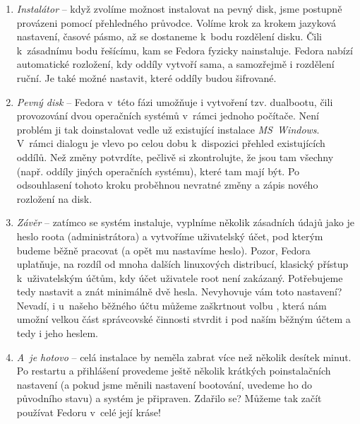 \begin{enumerate}
\item\emph{Instalátor} -- když zvolíme možnost instalovat na pevný disk, jsme postupně provázeni pomocí přehledného průvodce. Volíme krok za krokem jazyková nastavení, časové pásmo, až se dostaneme k~bodu rozdělení disku. Čili k~zásadnímu bodu řešícímu, kam se Fedora fyzicky nainstaluje. Fedora nabízí automatické rozložení, kdy oddíly vytvoří sama, a samozřejmě i rozdělení ruční. Je také možné nastavit, které oddíly budou šifrované. %

\item\emph{Pevný disk} -- Fedora v~této fázi umožňuje i vytvoření tzv. dualbootu, čili provozování dvou operačních systémů v~rámci jednoho počítače. Není problém ji tak doinstalovat vedle už existující instalace \emph{MS~Windows}. V~rámci dialogu je vlevo po celou dobu k~dispozici přehled existujících oddílů. Než změny potvrdíte, pečlivě si zkontrolujte, že jsou tam všechny (např. oddíly jiných operačních systému), které tam mají být. Po odsouhlasení tohoto kroku proběhnou nevratné změny a zápis nového rozložení na disk.

\item\emph{Závěr} -- zatímco se systém instaluje, vyplníme několik zásadních údajů jako je heslo roota (administrátora) a vytvoříme uživatelský účet, pod kterým budeme běžně pracovat (a opět mu nastavíme heslo). Pozor, Fedora uplatňuje, na rozdíl od mnoha dalších linuxových distribucí, klasický přístup k~uživatelským účtům, kdy účet uživatele root není zakázaný. Potřebujeme tedy nastavit a znát minimálně dvě hesla. Nevyhovuje vám toto nastavení? Nevadí, i u~našeho běžného účtu můžeme zaškrtnout volbu , která nám umožní velkou část správcovské činnosti stvrdit i pod naším běžným účtem a tedy i jeho heslem.%

\item\emph{A~je hotovo} -- celá instalace by neměla zabrat více než několik desítek minut. Po restartu a přihlášení provedeme ještě několik krátkých poinstalačních nastavení (a pokud jsme měnili nastavení bootování, uvedeme ho do původního stavu) a systém je připraven. Zdařilo se? Můžeme tak začít používat Fedoru v~celé její kráse!
\end{enumerate}

